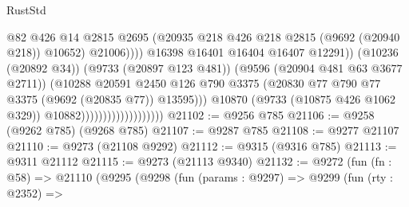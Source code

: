 \begin{lexlean}{RustStd}
\begin{coremodule}
{\begin{coremodule}
{{{{{{{{{{{{{{{{{{{{{{{{{{{{{{{{{{{{{{{{{{{{{{{{{{{{{{{                                                        @82
                                                        @426
                                                        @14
                                                        @2815
                                                        @2695
                                                        (@20935
                                                          @218
                                                          @426
                                                          @218
                                                          @2815
                                                          (@9692 (@20940 @218))
                                                          @10652)
                                                        @21006))))
                                                @16398
                                                @16401
                                                @16404
                                                @16407
                                                @12291))
                                            (@10236 (@20892 @34))
                                            (@9733 (@20897 @123 @481))
                                            (@9596 (@20904 @481 @63 @3677 @2711))
                                            (@10288
                                              @20591
                                              @2450
                                              @126
                                              @790
                                              @3375
                                              (@20830
                                                @77
                                                @790
                                                @77
                                                @3375
                                                (@9692 (@20835 @77))
                                                @13595)))
                                          @10870
                                          (@9733 (@10875 @426 @1062 @329))
                                          @10882)))))))))))))))))))
@21102 := @9256 @785
@21106 := @9258 (@9262 @785) (@9268 @785)
@21107 := @9287 @785
@21108 := @9277 @21107
@21110 := @9273 (@21108 @9292)
@21112 := @9315 (@9316 @785)
@21113 := @9311 @21112
@21115 := @9273 (@21113 @9340)
@21132 := @9272
    (fun (fn : @58) =>
    @21110
      (@9295
        (@9298
          (fun (params : @9297) =>
          @9299
            (fun (rty : @2352) =>
}}}}}}}}}}}}}}}}}}}}}}}}}}}}}}}}}}}}}}}}}}}}}}}}}}}}}}}
\end{coremodule}}
\end{coremodule}
\end{lexlean}
